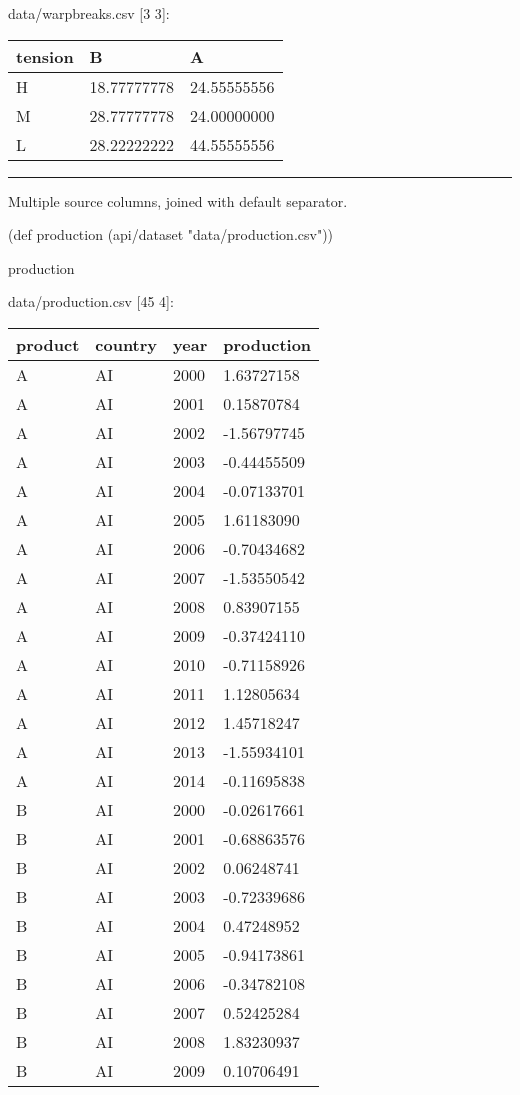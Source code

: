 \documentclass[]{article}
\newenvironment{Shaded}{\begin{snugshade}}{\end{snugshade}}
\newcommand{\BuiltInTok}[1]{#1}
\newcommand{\FunctionTok}[1]{\textcolor[rgb]{0.00,0.00,0.00}{#1}}
\newcommand{\NormalTok}[1]{#1}
\newcommand{\StringTok}[1]{\textcolor[rgb]{0.31,0.60,0.02}{#1}}
\begin{document}
data/warpbreaks.csv {[}3 3{]}:

\begin{longtable}[]{@{}lll@{}}
\toprule
tension & B & A\tabularnewline
\midrule
\endhead
H & 18.77777778 & 24.55555556\tabularnewline
M & 28.77777778 & 24.00000000\tabularnewline
L & 28.22222222 & 44.55555556\tabularnewline
\bottomrule
\end{longtable}

\begin{center}\rule{0.5\linewidth}{0.5pt}\end{center}

Multiple source columns, joined with default separator.

\begin{Shaded}
\begin{Highlighting}[]
\NormalTok{(}\BuiltInTok{def}\FunctionTok{ production }\NormalTok{(api/dataset }\StringTok{"data/production.csv"}\NormalTok{))}
\end{Highlighting}
\end{Shaded}

\begin{Shaded}
\begin{Highlighting}[]
\NormalTok{production}
\end{Highlighting}
\end{Shaded}

data/production.csv {[}45 4{]}:

\begin{longtable}[]{@{}llll@{}}
\toprule
product & country & year & production\tabularnewline
\midrule
\endhead
A & AI & 2000 & 1.63727158\tabularnewline
A & AI & 2001 & 0.15870784\tabularnewline
A & AI & 2002 & -1.56797745\tabularnewline
A & AI & 2003 & -0.44455509\tabularnewline
A & AI & 2004 & -0.07133701\tabularnewline
A & AI & 2005 & 1.61183090\tabularnewline
A & AI & 2006 & -0.70434682\tabularnewline
A & AI & 2007 & -1.53550542\tabularnewline
A & AI & 2008 & 0.83907155\tabularnewline
A & AI & 2009 & -0.37424110\tabularnewline
A & AI & 2010 & -0.71158926\tabularnewline
A & AI & 2011 & 1.12805634\tabularnewline
A & AI & 2012 & 1.45718247\tabularnewline
A & AI & 2013 & -1.55934101\tabularnewline
A & AI & 2014 & -0.11695838\tabularnewline
B & AI & 2000 & -0.02617661\tabularnewline
B & AI & 2001 & -0.68863576\tabularnewline
B & AI & 2002 & 0.06248741\tabularnewline
B & AI & 2003 & -0.72339686\tabularnewline
B & AI & 2004 & 0.47248952\tabularnewline
B & AI & 2005 & -0.94173861\tabularnewline
B & AI & 2006 & -0.34782108\tabularnewline
B & AI & 2007 & 0.52425284\tabularnewline
B & AI & 2008 & 1.83230937\tabularnewline
B & AI & 2009 & 0.10706491\tabularnewline
\bottomrule
\end{longtable}
\end{document}
